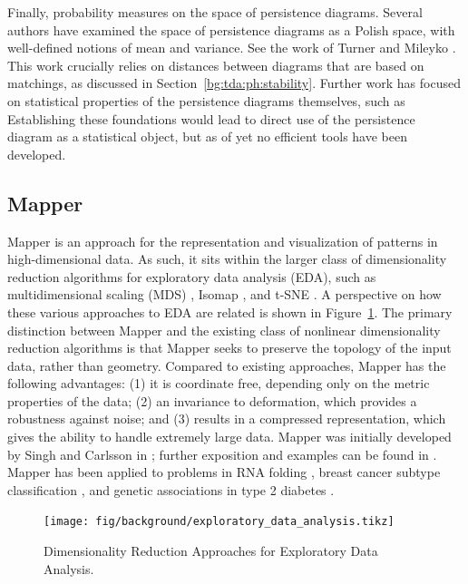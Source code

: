 Finally, probability measures on the space of persistence diagrams.
Several authors have examined the space of persistence diagrams as a Polish space, with well-defined notions of mean and variance.
See the work of Turner \cite{Turner:2012wb} and Mileyko \cite{Mileyko:2011jm}.
This work crucially relies on distances between diagrams that are based on matchings, as discussed in Section~\ref{bg:tda:ph:stability}.
Further work has focused on statistical properties of the persistence diagrams themselves, such as \cite{Chazal:2014vl}
Establishing these foundations would lead to direct use of the persistence diagram as a statistical object, but as of yet no efficient tools have been developed.

\subsection{Mapper}
\label{bg:tda:mapper}

Mapper is an approach for the representation and visualization of patterns in high-dimensional data.
As such, it sits within the larger class of dimensionality reduction algorithms for exploratory data analysis (EDA), such as multidimensional scaling (MDS) \cite{Kruskal:1964}, Isomap \cite{Tenenbaum:2000vq}, and t-SNE \cite{VanderMaaten:2008tm}.
A perspective on how these various approaches to EDA are related is shown in Figure~\ref{fig:bg:exploratory_data_analysis}.
The primary distinction between Mapper and the existing class of nonlinear dimensionality reduction algorithms is that Mapper seeks to preserve the topology of the input data, rather than geometry.
Compared to existing approaches, Mapper has the following advantages: (1) it is coordinate free, depending only on the metric properties of the data; (2) an invariance to deformation, which provides a robustness against noise; and (3) results in a compressed representation, which gives the ability to handle extremely large data.
Mapper was initially developed by Singh and Carlsson in \cite{Singh:2007ve}; further exposition and examples can be found in \cite{Lum:2013cz}.
Mapper has been applied to problems in RNA folding \cite{Bowman:2008esa}, breast cancer subtype classification \cite{Nicolau:2011}, and genetic associations in type 2 diabetes \cite{Li:2015gl}.

\begin{figure}
	\centering
	\texttt{[image: fig/background/exploratory\_data\_analysis.tikz]}
	\caption[Dimensionality Reduction for EDA]{Dimensionality Reduction Approaches for Exploratory Data Analysis.}
	\label{fig:bg:exploratory_data_analysis}
\end{figure}

